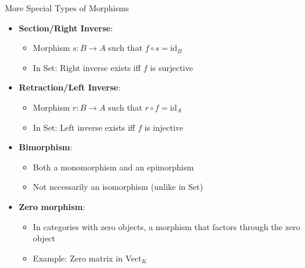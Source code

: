 \documentclass{beamer}
\begin{document}
\begin{frame}{More Special Types of Morphisms}
    \begin{itemize}
        \item \textbf{Section/Right Inverse}:
            \begin{itemize}
                \item Morphism $s: B \to A$ such that $f \circ s = \text{id}_B$
                \item In Set: Right inverse exists iff $f$ is surjective
            \end{itemize}
        \item \textbf{Retraction/Left Inverse}:
            \begin{itemize}
                \item Morphism $r: B \to A$ such that $r \circ f = \text{id}_A$
                \item In Set: Left inverse exists iff $f$ is injective
            \end{itemize}
        \item \textbf{Bimorphism}:
            \begin{itemize}
                \item Both a monomorphism and an epimorphism
                \item Not necessarily an isomorphism (unlike in Set)
            \end{itemize}
        \item \textbf{Zero morphism}:
            \begin{itemize}
                \item In categories with zero objects, a morphism that factors through the zero object
                \item Example: Zero matrix in Vect$_K$
            \end{itemize}
    \end{itemize}
\end{frame}
\end{document}
